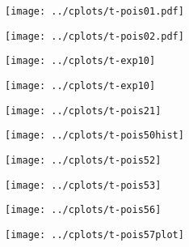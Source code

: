 \documentclass[12pt,english]{scrartcl}
\begin{document}






\texttt{[image: ../cplots/t-pois01.pdf]}


\texttt{[image: ../cplots/t-pois02.pdf]}


\texttt{[image: ../cplots/t-exp10]}



\texttt{[image: ../cplots/t-exp10]}






\texttt{[image: ../cplots/t-pois21]}












\texttt{[image: ../cplots/t-pois50hist]}






\texttt{[image: ../cplots/t-pois52]}


\texttt{[image: ../cplots/t-pois53]}










\texttt{[image: ../cplots/t-pois56]}




\texttt{[image: ../cplots/t-pois57plot]}
























\end{document}
